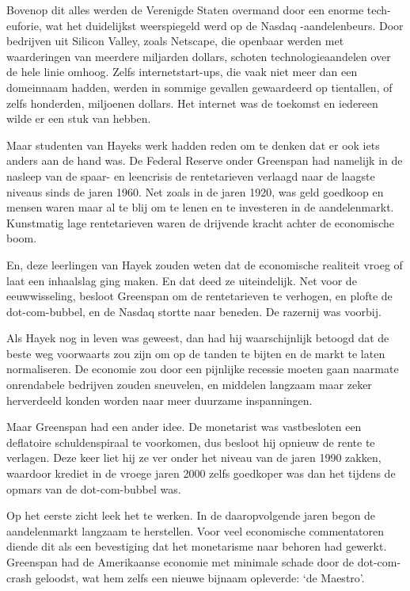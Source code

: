 \documentclass[
  a5paper,
  smalldemyvopaper,11pt,twoside,onecolumn,openright,extrafontsizes]{memoir}
\begin{document}
Bovenop dit alles werden de Verenigde Staten overmand door een enorme
tech-euforie, wat het duidelijkst weerspiegeld werd op de Nasdaq
-aandelenbeurs. Door bedrijven uit Silicon Valley, zoals Netscape, die
openbaar werden met waarderingen van meerdere miljarden dollars, schoten
technologieaandelen over de hele linie omhoog. Zelfs internetstart-ups,
die vaak niet meer dan een domeinnaam hadden, werden in sommige gevallen
gewaardeerd op tientallen, of zelfs honderden, miljoenen dollars. Het
internet was de toekomst en iedereen wilde er een stuk van hebben.

Maar studenten van Hayeks werk hadden reden om te denken dat er ook iets
anders aan de hand was. De Federal Reserve onder Greenspan had namelijk
in de nasleep van de spaar- en leencrisis de rentetarieven verlaagd naar
de laagste niveaus sinds de jaren 1960. Net zoals in de jaren 1920, was
geld goedkoop en mensen waren maar al te blij om te lenen en te
investeren in de aandelenmarkt. Kunstmatig lage rentetarieven waren de
drijvende kracht achter de economische boom.

En, deze leerlingen van Hayek zouden weten dat de economische realiteit
vroeg of laat een inhaalslag ging maken. En dat deed ze uiteindelijk.
Net voor de eeuwwisseling, besloot Greenspan om de rentetarieven te
verhogen, en plofte de dot-com-bubbel, en de Nasdaq stortte naar
beneden. De razernij was voorbij.

Als Hayek nog in leven was geweest, dan had hij waarschijnlijk betoogd
dat de beste weg voorwaarts zou zijn om op de tanden te bijten en de
markt te laten normaliseren. De economie zou door een pijnlijke recessie
moeten gaan naarmate onrendabele bedrijven zouden sneuvelen, en middelen
langzaam maar zeker herverdeeld konden worden naar meer duurzame
inspanningen.

Maar Greenspan had een ander idee. De monetarist was vastbesloten een
deflatoire schuldenspiraal te voorkomen, dus besloot hij opnieuw de
rente te verlagen. Deze keer liet hij ze ver onder het niveau van de
jaren 1990 zakken, waardoor krediet in de vroege jaren 2000 zelfs
goedkoper was dan het tijdens de opmars van de dot-com-bubbel was.

Op het eerste zicht leek het te werken. In de daaropvolgende jaren begon
de aandelenmarkt langzaam te herstellen. Voor veel economische
commentatoren diende dit als een bevestiging dat het monetarisme naar
behoren had gewerkt. Greenspan had de Amerikaanse economie met minimale
schade door de dot-com-crash geloodst, wat hem zelfs een nieuwe bijnaam
opleverde: `de Maestro'.
\end{document}
